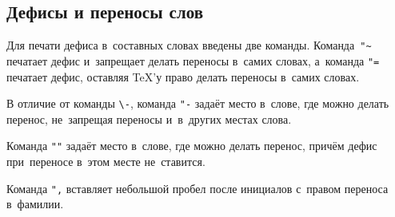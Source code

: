 \subsection{Дефисы и переносы слов}
Для печати дефиса в~составных словах введены две команды. Команда~\verb|"~|
печатает дефис и~запрещает делать переносы в~самих словах, а~команда \verb|"=|
печатает дефис, оставляя \TeX ’у право делать переносы в~самих словах.

В отличие от команды \verb|\-|, команда \verb|"-| задаёт место в~слове, где
можно делать перенос, не~запрещая переносы и~в~других местах слова.

Команда \verb|""| задаёт место в~слове, где можно делать перенос, причём дефис
при~переносе в~этом месте не~ставится.

Команда \verb|",| вставляет небольшой пробел после инициалов с~правом переноса
в~фамилии.

\FloatBarrier
